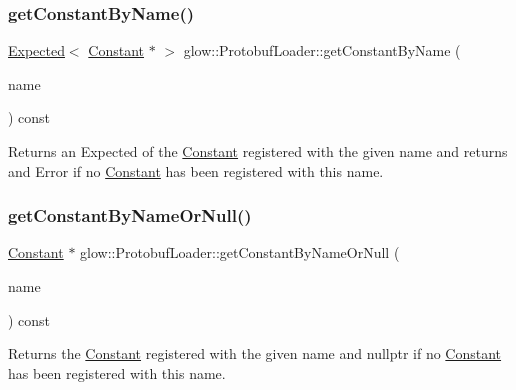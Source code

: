 \subsubsection{\texorpdfstring{get\+Constant\+By\+Name()}{getConstantByName()}}
{\footnotesize\ttfamily \hyperlink{classglow_1_1detail_1_1_glow_expected}{Expected}$<$ \hyperlink{classglow_1_1_constant}{Constant} $\ast$ $>$ glow\+::\+Protobuf\+Loader\+::get\+Constant\+By\+Name (\begin{DoxyParamCaption}\item[{llvm\+::\+String\+Ref}]{name }\end{DoxyParamCaption}) const\hspace{0.3cm}{\ttfamily [protected]}}

\begin{DoxyReturn}{Returns}
an Expected of the \hyperlink{classglow_1_1_constant}{Constant} registered with the given {\ttfamily name} and returns and Error if no \hyperlink{classglow_1_1_constant}{Constant} has been registered with this name. 
\end{DoxyReturn}
\mbox{\label{classglow_1_1_protobuf_loader_a85a86c2a07a5c396cc6a9fd25de6a2ae}} 
\subsubsection{\texorpdfstring{get\+Constant\+By\+Name\+Or\+Null()}{getConstantByNameOrNull()}}
{\footnotesize\ttfamily \hyperlink{classglow_1_1_constant}{Constant} $\ast$ glow\+::\+Protobuf\+Loader\+::get\+Constant\+By\+Name\+Or\+Null (\begin{DoxyParamCaption}\item[{llvm\+::\+String\+Ref}]{name }\end{DoxyParamCaption}) const\hspace{0.3cm}{\ttfamily [protected]}}

\begin{DoxyReturn}{Returns}
the \hyperlink{classglow_1_1_constant}{Constant} registered with the given {\ttfamily name} and nullptr if no \hyperlink{classglow_1_1_constant}{Constant} has been registered with this name. 
\end{DoxyReturn}
\mbox{\label{classglow_1_1_protobuf_loader_ac07756504a756acf83d49ef59ae1ff2f}} 
